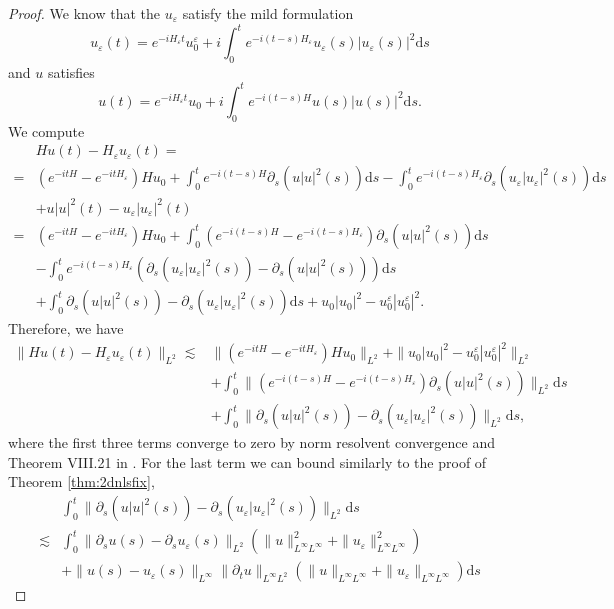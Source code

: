 \documentclass[11pt, oneside]{article}   	%
\newcommand{\mathd}{\mathrm{d}}
\begin{document}
\begin{proof}

We know that the $u_\varepsilon$ satisfy the mild formulation
	\[ u_{\varepsilon} (t) = e^{- i H_{\varepsilon} t} u^{\varepsilon}_0 +i
	\int_0^t e^{- i  (t - s)H_{\varepsilon}}  u_{\varepsilon} (s)|u_{\varepsilon} (s)|^2 \mathd s
	\]
and $u$ satisfies
	\[ u (t) = e^{- i H_{\varepsilon} t} u_0 +
i\int_0^t e^{- i  (t - s)H}  u (s)|u (s)|^2 \mathd s.
\]
We compute
\begin{align*}
& H u(t)-H_\varepsilon u_\varepsilon(t)= \\=&(e^{-itH}-e^{-itH_\varepsilon})Hu_0+\int_{0}^{t}e^{-i(t-s)H}\partial_s(u|u|^2(s)) \mathd s-\int_{0}^{t}e^{-i(t-s)H_\varepsilon}\partial_s(u_\varepsilon|u_\varepsilon|^2(s)) \mathd s\\&+u|u|^2(t)-u_\varepsilon|u_\varepsilon|^2(t)\\
=&(e^{-itH}-e^{-itH_\varepsilon})Hu_0+\int_{0}^{t}(e^{-i(t-s)H}-e^{-i(t-s)H_\varepsilon})\partial_s(u|u|^2(s)) \mathd s\\&-\int_{0}^{t}e^{-i(t-s)H_\varepsilon}(\partial_s(u_\varepsilon|u_\varepsilon|^2(s))-\partial_s(u|u|^2(s))) \mathd s\\&+\int_{0}^{t}\partial_s(u|u|^2(s))-\partial_s(u_\varepsilon|u_\varepsilon|^2(s))\mathd s+u_0|u_0|^2-u^\varepsilon_0|u^\varepsilon_0|^2.
\end{align*}
Therefore, we have
\begin{align*}
\|H u(t)-H_\varepsilon u_\varepsilon(t)\|_{L^2}\lesssim& \|(e^{-itH}-e^{-itH_\varepsilon})Hu_0\|_{L^2}+\|u_0|u_0|^2-u^\varepsilon_0|u^\varepsilon_0|^2\|_{L^2}\\&+\int_{0}^{t}\|(e^{-i(t-s)H}-e^{-i(t-s)H_\varepsilon})\partial_s(u|u|^2(s))\|_{L^2} \mathd s\\
&+\int_{0}^{t}\|\partial_s(u|u|^2(s))-\partial_s(u_\varepsilon|u_\varepsilon|^2(s))\|_{L^2}\mathd s,
\end{align*}
where the first three terms converge to zero by norm resolvent convergence and Theorem VIII.21 in {\cite{reedsimon1}}. For the last term we can bound similarly to the proof of Theorem \ref{thm:2dnlsfix},
\begin{align*}
&\int_{0}^{t}\|\partial_s(u|u|^2(s))-\partial_s(u_\varepsilon|u_\varepsilon|^2(s))\|_{L^2}\mathd s\\ \lesssim&\int_{0}^{t}\|\partial_su(s)-\partial_su_\varepsilon(s)\|_{L^2}(\|u\|^2_{L^\infty L^\infty}+\|u_\varepsilon\|^2_{L^\infty L^\infty})\\&+\|u(s)-u_\varepsilon(s)\|_{L^\infty}\|\partial_t u\|_{L^\infty L^2}(\|u\|_{L^\infty L^\infty}+\|u_\varepsilon\|_{L^\infty L^\infty})\mathd s

\end{align*}
\end{proof}
\end{document}
